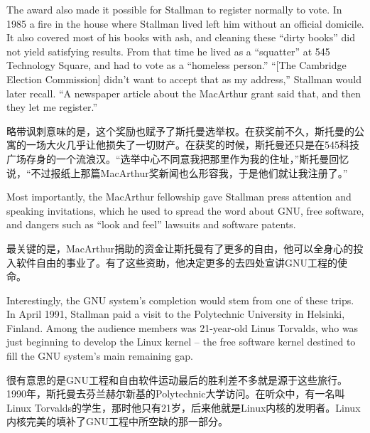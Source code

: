 \ifdefined\eng
The award also made it possible for Stallman to register normally to vote. In 1985 a fire in the house where Stallman lived left him without an official domicile.  It also covered most of his books with ash, and cleaning these ``dirty books'' did not yield satisfying results. From that time he lived as a ``squatter'' at 545 Technology Square, and had to vote as a ``homeless person.'' ``[The Cambridge Election Commission] didn't want to accept that as my address,'' Stallman would later recall. ``A newspaper article about the MacArthur grant said that, and then they let me register.''
\fi

\ifdefined\chs

略带讽刺意味的是，这个奖励也赋予了斯托曼选举权。在获奖前不久，斯托曼的公寓的一场大火几乎让他损失了一切财产。在获奖的时候，斯托曼还只是在545科技广场存身的一个流浪汉。``选举中心不同意我把那里作为我的住址，''斯托曼回忆说，``不过报纸上那篇MacArthur奖新闻也么形容我，于是他们就让我注册了。''
\fi

\ifdefined\eng
Most importantly, the MacArthur fellowship gave Stallman press attention and speaking invitations, which he used to spread the word about GNU, free software, and dangers such as ``look and feel'' lawsuits and software patents.
\fi

\ifdefined\chs
最关键的是，MacArthur捐助的资金让斯托曼有了更多的自由，他可以全身心的投入软件自由的事业了。有了这些资助，他决定更多的去四处宣讲GNU工程的使命。
\fi

\ifdefined\eng
Interestingly, the GNU system's completion would stem from one of these trips. In April 1991, Stallman paid a visit to the Polytechnic University in Helsinki, Finland. Among the audience members was 21-year-old Linus Torvalds, who was just beginning to develop the Linux kernel -- the free software kernel destined to fill the GNU system's main remaining gap.
\fi

\ifdefined\chs
很有意思的是GNU工程和自由软件运动最后的胜利差不多就是源于这些旅行。1990年，斯托曼去芬兰赫尔新基的Polytechnic大学访问。在听众中，有一名叫Linux Torvalds的学生，那时他只有21岁，后来他就是Linux内核的发明者。Linux内核完美的填补了GNU工程中所空缺的那一部分。
\fi

